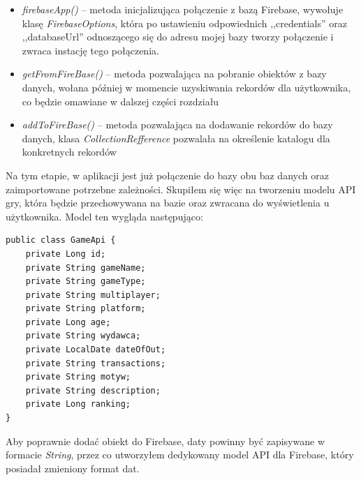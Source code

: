 \begin{itemize}
\item \textit{firebaseApp()} -- metoda inicjalizująca połączenie z bazą Firebase, wywołuje klasę \textit{FirebaseOptions}, która po ustawieniu odpowiednich ,,credentials'' oraz ,,databaseUrl'' odnoszącego się do adresu mojej bazy tworzy połączenie i zwraca instację tego połączenia.

\item \textit{getFromFireBase()} -- metoda pozwalająca na pobranie obiektów z bazy danych, wołana później w momencie uzyskiwania rekordów dla użytkownika, co będzie omawiane w dalszej części rozdziału

\item \textit{addToFireBase()} -- metoda pozwalająca na dodawanie rekordów do bazy danych, klasa \textit{CollectionRefference} pozwalała na określenie katalogu dla konkretnych rekordów 
\end{itemize}

Na tym etapie, w aplikacji jest już połączenie do bazy obu baz danych oraz zaimportowane potrzebne zależności. Skupiłem się więc na tworzeniu modelu API gry, która będzie przechowywana na bazie oraz zwracana do wyświetlenia u użytkownika. Model ten wygląda następująco:
\begin{lstlisting}
public class GameApi {
    private Long id;
    private String gameName;
    private String gameType;
    private String multiplayer;
    private String platform;
    private Long age;
    private String wydawca;
    private LocalDate dateOfOut;
    private String transactions;
    private String motyw;
    private String description;
    private Long ranking;
}
\end{lstlisting}

Aby poprawnie dodać obiekt do Firebase, daty powinny być zapisywane w formacie \textit{String}, przez co utworzyłem dedykowany model API dla Firebase, który posiadał zmieniony format dat.

